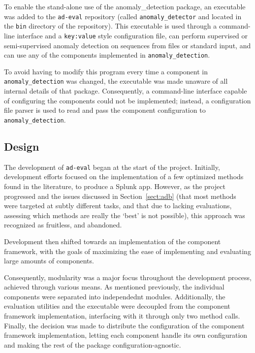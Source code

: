 To enable the stand-alone use of the anomaly\_detection package, an executable was added to the \texttt{ad-eval} repository (called \texttt{anomaly\_detector} and located in the \texttt{bin} directory of the repository). This executable is used through a command-line interface and a \texttt{key:value} style configuration file, can perform supervised or semi-supervised anomaly detection on sequences from files or standard input, and can use any of the components implemented in \texttt{anomaly\_detection}.

To avoid having to modify this program every time a component in \texttt{anomaly\_detection} was changed, the executable was made unaware of all internal details of that package. Consequently, a command-line interface capable of configuring the components could not be implemented; instead, a configuration file parser is used to read and pass the component configuration to \texttt{anomaly\_detection}.

\subsection{Design}
\label{sect:design}

The development of \texttt{ad-eval} began at the start of the project. Initially, development efforts focused on the implementation of a few optimized methods found in the literature, to produce a Splunk app. However, as the project progressed and the issues discussed in Section~\ref{sect:adb} (that most methods were targeted at subtly different tasks, and that due to lacking evaluations, assessing which methods are really the `best' is not possible), this approach was recognized as fruitless, and abandoned.

Development then shifted towards an implementation of the component framework, with the goals of maximizing the ease of implementing and evaluating large amounts of components.

Consequently, modularity was a major focus throughout the development process, achieved through various means. As mentioned previously, the individual components were separated into independednt modules. Additionally, the evaluation utilities and the executable were decoupled from the component framework implementation, interfacing with it through only two method calls. Finally, the decision was made to distribute the configuration of the component framework implementation, letting each component handle its own configuration and making the rest of the package configuration-agnostic.

